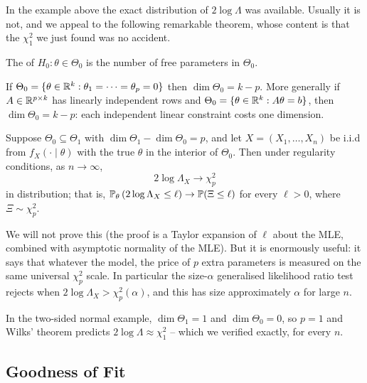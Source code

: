 \documentclass[a4paper]{scrartcl}
\begin{document}
In the example above the exact distribution of $2\log\Lambda$ was available. Usually it is not, and we appeal to the following remarkable theorem, whose content is that the $\chi^2_1$ we just found was no accident.

\begin{definition}
  The  of $H_0 : \theta \in \Theta_0$ is the number of free parameters in $\Theta_0$.
\end{definition}

\begin{example}
  If $\Theta_0 = \{\theta \in \mathbb{R}^k : \theta_1 = \cdots = \theta_p = 0\}$ then $\dim\Theta_0 = k - p$. More generally if $A \in \mathbb{R}^{p\times k}$ has linearly independent rows and $\Theta_0 = \{\theta \in \mathbb{R}^k : A\theta = b\}$, then $\dim\Theta_0 = k - p$: each independent linear constraint costs one dimension.
\end{example}

\begin{theorem}[Wilks]
  Suppose $\Theta_0 \subseteq \Theta_1$ with $\dim\Theta_1 - \dim\Theta_0 = p$, and let $X = (X_1, \dots, X_n)$ be i.i.d from $f_X(\cdot\mid\theta)$ with the true $\theta$ in the interior of $\Theta_0$. Then under regularity conditions, as $n \to \infty$,
  $$
  2\log\Lambda_X \to \chi^2_p
  $$
  in distribution; that is, $\mathbb{P}_\theta\left(2\log\Lambda_X \leq \ell\right) \to \mathbb{P}(\Xi \leq \ell)$ for every $\ell > 0$, where $\Xi \sim \chi^2_p$.
\end{theorem}

We will not prove this (the proof is a Taylor expansion of $\ell$ about the MLE, combined with asymptotic normality of the MLE). But it is enormously useful: it says that whatever the model, the price of $p$ extra parameters is measured on the same universal $\chi^2_p$ scale. In particular the size-$\alpha$ generalised likelihood ratio test rejects when $2\log\Lambda_X > \chi^2_p(\alpha)$, and this has size approximately $\alpha$ for large $n$.

\begin{example}
  In the two-sided normal example, $\dim\Theta_1 = 1$ and $\dim\Theta_0 = 0$, so $p = 1$ and Wilks' theorem predicts $2\log\Lambda \approx \chi^2_1$ -- which we verified exactly, for every $n$.
\end{example}

\subsection{Goodness of Fit}
\end{document}
